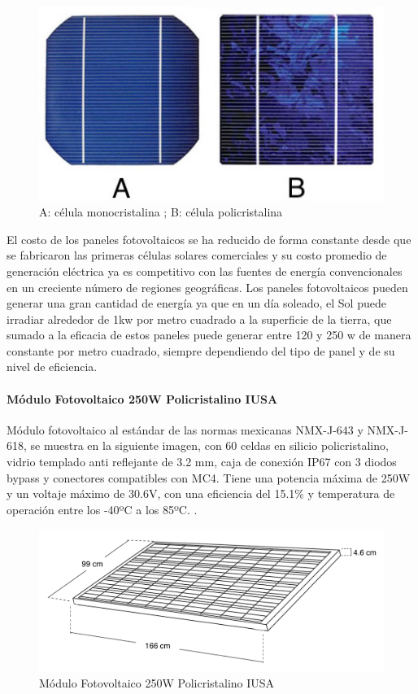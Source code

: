 \begin{figure}[H]
	\centering
	\includegraphics[scale=.50]{Capitulo2/images/tipospaneles.jpg}
	\caption{A: célula monocristalina ; B: célula policristalina}
	\label{fig:diagrama_dispensador}
\end{figure}

El costo de los paneles fotovoltaicos se ha reducido de forma constante desde que se fabricaron las primeras células solares comerciales y su costo promedio de generación eléctrica ya es competitivo con las fuentes de energía convencionales en un creciente número de regiones geográficas.
Los paneles fotovoltaicos pueden generar una gran cantidad de energía ya que en un día soleado, el Sol puede irradiar alrededor de 1kw por metro cuadrado a la superficie de la tierra, que sumado a la eficacia de estos paneles puede generar entre 120 y 250 w de manera constante por metro cuadrado, siempre dependiendo del tipo de panel y de su nivel de eficiencia.

\paragraph{Módulo Fotovoltaico 250W Policristalino IUSA}
Módulo fotovoltaico al estándar de las normas mexicanas NMX-J-643 y NMX-J-618, se muestra en la siguiente imagen, con 60 celdas en silicio policristalino, vidrio templado anti reflejante de 3.2 mm, caja de conexión IP67 con 3 diodos bypass y conectores compatibles con MC4.
Tiene una potencia máxima de 250W y un voltaje máximo de 30.6V, con una eficiencia del 15.1\% y temperatura de operación entre los -40ºC a los 85ºC. \citep{MarcoTeorico3}.

\begin{figure}[H]
	\centering
	\includegraphics[scale=.25]{Capitulo2/images/panel.png}
	\caption{Módulo Fotovoltaico 250W Policristalino IUSA}
	\label{fig:diagrama_dispensador}
\end{figure}

